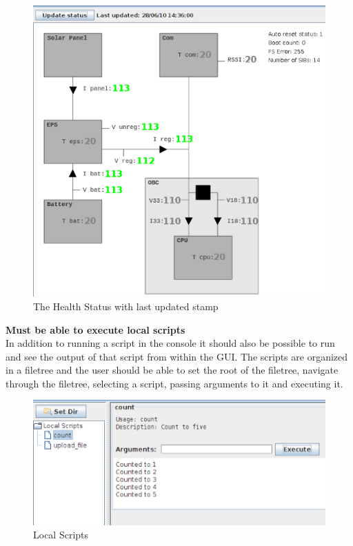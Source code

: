 \begin{figure}[h!] \centering
	\includegraphics[scale=0.7]{img/fsgui_health}
  \caption{The Health Status with last updated stamp}
\end{figure}

\textbf{Must be able to execute local scripts} \\
In addition to running a script in the console it should also be possible to run and see the output of that script from within the GUI. The scripts are organized in a filetree and the user should be able to set the root of the filetree, navigate through the filetree, selecting a script, passing arguments to it and executing it.

\begin{figure}[h!] \centering
	\includegraphics[scale=0.7]{img/fsgui_local}
  \caption{Local Scripts}
\end{figure}


